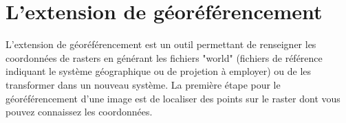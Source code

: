 
\section{L'extension de géoréférencement}


L'extension de géoréférencement est un outil permettant de renseigner les coordonnées de rasters en générant les fichiers "world" (fichiers de référence indiquant le système géographique ou de projetion à employer) ou de les transformer dans un nouveau système. La première étape pour le géoréférencement d'une image est de localiser des points sur le raster dont vous pouvez connaissez les coordonnées.



